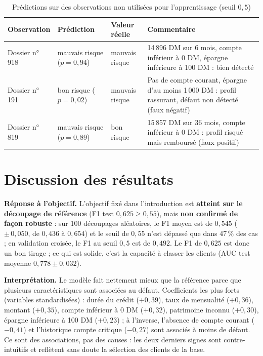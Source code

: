 \documentclass[12pt,a4paper]{article}
\begin{document}
\begin{table}[H]
\centering\small
\caption{Prédictions sur des observations non utilisées pour l’apprentissage (seuil $0{,}5$)}
\begin{tabularx}{\linewidth}{@{}lllY@{}}
\toprule
Observation & Prédiction & Valeur réelle & Commentaire \\
\midrule
Dossier n°\,918 & mauvais risque ($p=0{,}94$) & mauvais risque & 14\,896 DM sur 6 mois, compte inférieur à 0 DM, épargne inférieure à 100 DM : bien détecté \\
Dossier n°\,191 & bon risque ($p=0{,}02$) & mauvais risque & Pas de compte courant, épargne d’au moins 1\,000 DM : profil rassurant, défaut non détecté (faux négatif) \\
Dossier n°\,819 & mauvais risque ($p=0{,}89$) & bon risque & 15\,857 DM sur 36 mois, compte inférieur à 0 DM : profil risqué mais remboursé (faux positif) \\
\bottomrule
\end{tabularx}
\end{table}

\section{Discussion des résultats}\label{sec:disc}
\textbf{Réponse à l’objectif.} L’objectif fixé dans l’introduction est \textbf{atteint sur le découpage de référence} (F1 test $0{,}625\ge0{,}55$), mais \textbf{non confirmé de façon robuste} : sur 100 découpages aléatoires, le F1 moyen est de $0{,}545$ ($\pm\,0{,}050$, de $0{,}436$ à $0{,}654$) et le seuil de $0{,}55$ n’est dépassé que dans 47\,\% des cas ; en validation croisée, le F1 au seuil $0{,}5$ est de $0{,}492$. Le F1 de $0{,}625$ est donc un bon tirage ; ce qui est solide, c’est la capacité à classer les clients (AUC test moyenne $0{,}778\pm0{,}032$).

\textbf{Interprétation.} Le modèle fait nettement mieux que la référence parce que plusieurs caractéristiques sont associées au défaut. Coefficients les plus forts (variables standardisées) : durée du crédit ($+0{,}39$), taux de mensualité ($+0{,}36$), montant ($+0{,}35$), compte inférieur à 0 DM ($+0{,}32$), patrimoine inconnu ($+0{,}30$), épargne inférieure à 100 DM ($+0{,}23$) ; à l’inverse, l’absence de compte courant ($-0{,}41$) et l’historique \og compte critique \fg{} ($-0{,}27$) sont associés à moins de défaut. Ce sont des associations, pas des causes : les deux derniers signes sont contre-intuitifs et reflètent sans doute la sélection des clients de la base.
\end{document}
